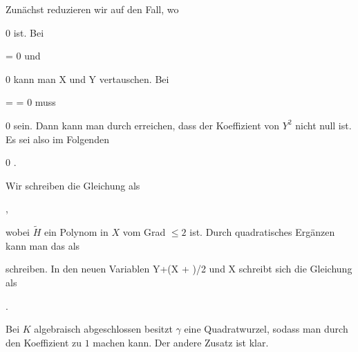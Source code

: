 {





Zunächst reduzieren wir auf den Fall, wo

\mavergleichskette
{\vergleichskette
{ \gamma
}
{ \neq }{ 0
}
{  }{
}
{    }{
}
{   }{
}
}
{}{}{}
ist. Bei

\mavergleichskette
{\vergleichskette
{ \gamma
}
{ = }{ 0
}
{  }{
}
{    }{
}
{   }{
}
}
{}{}{}
und

\mavergleichskette
{\vergleichskette
{ \alpha
}
{ \neq }{ 0
}
{  }{
}
{    }{
}
{   }{
}
}
{}{}{}
kann man
\mathkor {} {X} {und} {Y} {}
vertauschen. Bei

\mavergleichskette
{\vergleichskette
{ \alpha
}
{ = }{ \gamma
}
{ = }{ 0
}
{    }{
}
{   }{
}
}
{}{}{}
muss

\mavergleichskette
{\vergleichskette
{ \beta
}
{ \neq }{ 0
}
{  }{
}
{    }{
}
{   }{
}
}
{}{}{}
sein. Dann kann man durch
 erreichen, dass der Koeffizient von $Y^2$ nicht null ist. Es sei also im Folgenden

\mavergleichskette
{\vergleichskette
{ \gamma
}
{ \neq }{ 0
}
{  }{
}
{    }{
}
{   }{
}
}
{}{}{.}

Wir schreiben die Gleichung als

 { , }

wobei $\tilde{H}$ ein Polynom in $X$ vom Grad $\leq 2$ ist. Durch quadratisches Ergänzen kann man das als

 {  }

schreiben. In den neuen Variablen
\mathkor {} {Y+(\beta X + \epsilon)/2\gamma} {und} {X} {}
schreibt sich die Gleichung als

 { . }


Bei $K$ algebraisch abgeschlossen besitzt $\gamma$ eine Quadratwurzel, sodass man durch
 den Koeffizient zu $1$ machen kann. Der andere Zusatz ist klar.




}







